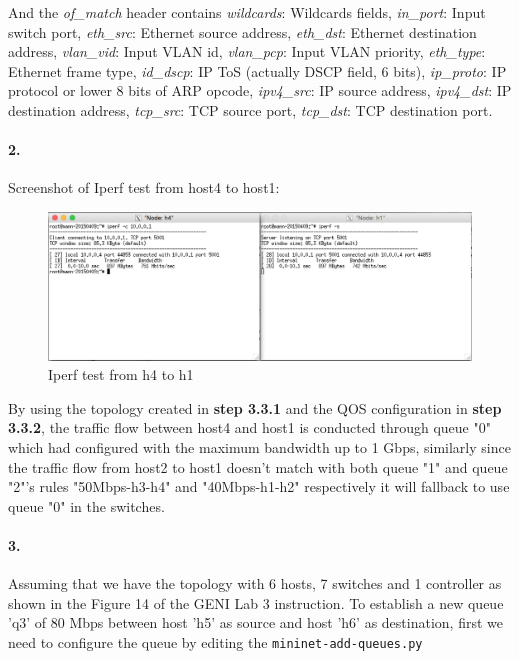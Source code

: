 \documentclass[a4paper]{article}
\begin{document}
And the \emph{of\_match} header contains \emph{wildcards}: Wildcards fields, \emph{in\_port}: Input switch port, \emph{eth\_src}: Ethernet source address, \emph{eth\_dst}: Ethernet destination address, \emph{vlan\_vid}: Input VLAN id, \emph{vlan\_pcp}: Input VLAN priority, \emph{eth\_type}: Ethernet frame type, \emph{id\_dscp}: IP ToS (actually DSCP field, 6 bits), \emph{ip\_proto}: IP protocol or lower 8 bits of ARP opcode, \emph{ipv4\_src}: IP source address, \emph{ipv4\_dst}: IP destination address, \emph{tcp\_src}: TCP source port, \emph{tcp\_dst}: TCP destination port.


\paragraph{2. } Screenshot of Iperf test from host4 to host1:
\begin{figure}[H]
  \centering
    \includegraphics[scale=.47]{iperf_h4_h1.png}
  \caption{Iperf test from h4 to h1}
\end{figure}

By using the topology created in \textbf{step 3.3.1} and the QOS configuration in \textbf{step 3.3.2}, the traffic flow between host4 and host1 is conducted through queue "0" which had configured with the maximum bandwidth up to 1 Gbps, similarly since the traffic flow from host2 to host1 doesn't match with both queue "1" and queue "2"'s rules "50Mbps-h3-h4" and "40Mbps-h1-h2" respectively it will fallback to use queue "0" in the switches.


\paragraph{3. } Assuming that we have the topology with 6 hosts, 7 switches and 1 controller as shown in the Figure 14 of the GENI Lab 3 instruction. To establish a new queue 'q3' of 80 Mbps between host 'h5' as source and host 'h6' as destination, first we need to configure the queue by editing the \texttt{mininet-add-queues.py}
\end{document}
